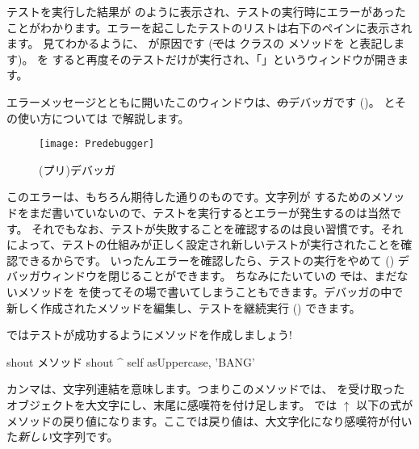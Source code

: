 \documentclass[a4paper,10pt,twoside]{book}
\begin{document}
テストを実行した結果が  のように表示され、テストの実行時にエラーがあったことがわかります。エラーを起こしたテストのリストは右下のペインに表示されます。 見てわかるように、 が原因です
(\st では  クラスの  メソッドを  と表記します)。
 を \click すると再度そのテストだけが実行され、「」というウィンドウが開きます。

エラーメッセージとともに開いたこのウィンドウは、\st のデバッガです ()。
とその使い方については  で解説します。

\begin{figure}[hbt]
\centerline {\texttt{[image: Predebugger]}}
\caption{(プリ)デバッガ}
\end{figure}

このエラーは、もちろん期待した通りのものです。文字列が  するためのメソッドをまだ書いていないので、テストを実行するとエラーが発生するのは当然です。
それでもなお、テストが失敗することを確認するのは良い習慣です。それによって、テストの仕組みが正しく設定され新しいテストが実行されたことを確認できるからです。
いったんエラーを確認したら、テストの実行をやめて () デバッガウィンドウを閉じることができます。
ちなみにたいていの \st では、まだないメソッドを  を使ってその場で書いてしまうこともできます。デバッガの中で新しく作成されたメソッドを編集し、テストを継続実行 () できます。

ではテストが成功するようにメソッドを作成しましょう!

\begin{method}[shout]{shout メソッド}
shout
	^ self asUppercase, 'BANG'
\end{method}

カンマは、文字列連結を意味します。つまりこのメソッドでは、 を受け取った  オブジェクトを大文字にし、末尾に感嘆符を付け足します。
\pharo では $\uparrow$ 以下の式がメソッドの戻り値になります。ここでは戻り値は、大文字化になり感嘆符が付いた\emph{新しい}文字列です。
\end{document}
